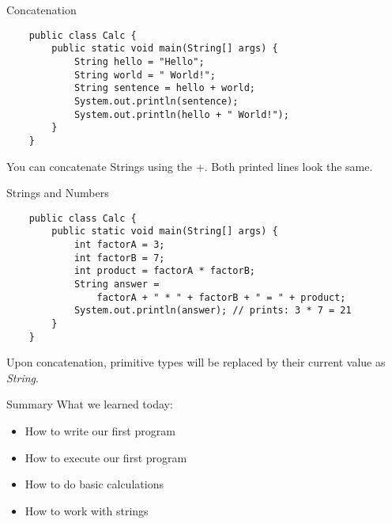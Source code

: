 \begin{frame}[fragile]{Concatenation}
	\begin{lstlisting}
	public class Calc {
	    public static void main(String[] args) {
	        String hello = "Hello";
	        String world = " World!";
	        String sentence = hello + world;
	        System.out.println(sentence);
	        System.out.println(hello + " World!");
	    }
	}
	\end{lstlisting}
	You can concatenate Strings using the +. Both printed lines look the same.
\end{frame}

\begin{frame}[fragile]{Strings and Numbers}
	\begin{lstlisting}
	public class Calc {
	    public static void main(String[] args) {
	    	int factorA = 3;
	    	int factorB = 7;
	    	int product = factorA * factorB;
	    	String answer =
	            factorA + " * " + factorB + " = " + product;
	        System.out.println(answer); // prints: 3 * 7 = 21
	    }
	}
	\end{lstlisting}
	Upon concatenation, primitive types will be replaced by their current value as \emph{String}.
\end{frame}

\begin{frame}[fragile]{Summary}
	What we learned today: \\
	\begin{itemize}
		\item How to write our first program
		\item How to execute our first program
		\item How to do basic calculations
		\item How to work with strings
	\end{itemize}
\end{frame}



